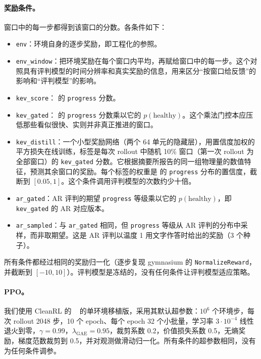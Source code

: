 \paragraph{奖励条件。} 窗口中的每一步都得到该窗口的分数。各条件如下：
\begin{itemize}
\item \texttt{env}：环境自身的逐步奖励，即工程化的参照。
\item \texttt{env\_window}：把环境奖励在每个窗口内平均，再赋给窗口中的每一步。这个对照具有评判模型的时间分辨率和真实奖励的信息，用来区分“按窗口给反馈”的影响和“评判模型”的影响。
\item \texttt{kev\_score}：\kev{} 的 \texttt{progress} 分数。
\item \texttt{kev\_gated}：\kev{} 的 \texttt{progress} 分数乘以它的 $p(\text{healthy})$。这个乘法门控本应压低那些看似很快、实则并非真正推进的窗口。
\item \texttt{kev\_distill}：一个小型奖励网络（两个 64 单元的隐藏层），用置信度加权的平方损失在线训练，标签是每次 rollout 中随机 10\% 窗口（第一次 rollout 为全部窗口）的 \texttt{kev\_gated} 分数。它根据摘要所报告的同一组物理量的数值特征，预测其余窗口的奖励。每个标签的权重是 \kev{} 的 \texttt{progress} 分布的置信度，截断到 $[0.05,1]$。这个条件调用评判模型的次数约少十倍。
\item \texttt{ar\_gated}：AR 评判的期望 \texttt{progress} 等级乘以它的 $p(\text{healthy})$，即 \texttt{kev\_gated} 的 AR 对应版本。
\item \texttt{ar\_sampled}：与 \texttt{ar\_gated} 相同，但 \texttt{progress} 等级从 AR 评判的分布中采样，而非取期望。这是 AR 评判以温度 1 用文字作答时给出的奖励（3 个种子）。
\end{itemize}
所有条件都经过相同的奖励归一化（逐步复现 gymnasium 的 \texttt{NormalizeReward}，并截断到 $[-10,10]$）。评判模型是冻结的，没有任何条件让评判模型适应策略。

\paragraph{PPO。} 我们使用 CleanRL 的 ~\cite{huang2022cleanrl,schulman2017ppo} 的单环境移植版，采用其默认超参数：$10^6$ 个环境步，每次 rollout 2048 步，10 个 epoch、每个 epoch 32 个小批量，学习率 $3\cdot10^{-4}$ 线性退火到零，$\gamma=0.99$，$\lambda_{\text{GAE}}=0.95$，裁剪系数 0.2，价值损失系数 0.5，无熵奖励，梯度范数裁剪到 0.5，并对观测做滑动归一化。所有条件的超参数相同，没有为任何条件调参。


